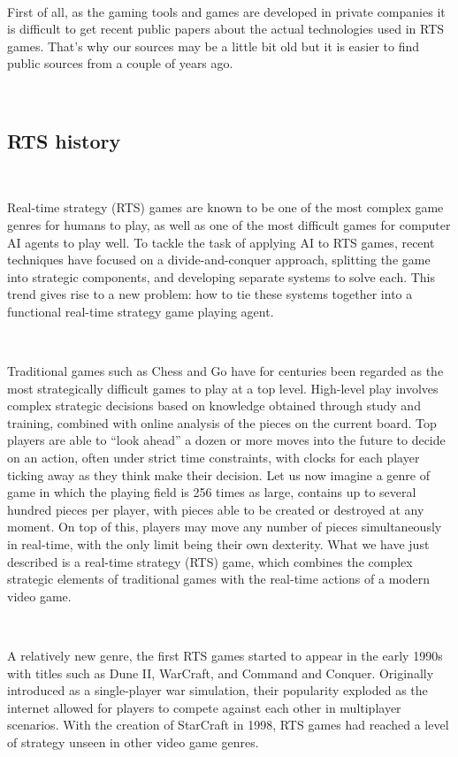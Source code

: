 \documentclass[a4paper,10pt]{book}
\begin{document}
~

First of all, as the gaming tools and games are developed in private companies it is difficult to get recent public papers about the actual technologies used in RTS games. 
That's why our sources may be a little bit old but it is easier to find public sources from a couple of years ago.

~

\subsection{RTS history}

~

Real-time strategy (RTS) games are known to be one of the
most  complex  game  genres  for  humans  to  play,  as  well  as
one  of  the  most  difficult  games  for  computer  AI  agents  to
play well.  To tackle the task of applying AI to RTS games,
recent techniques have focused on a divide-and-conquer approach, 
splitting the game into strategic components, and developing 
separate systems to solve each. This trend gives rise
to  a  new  problem:   how  to  tie  these  systems  together  into
a functional real-time strategy game playing agent.

~

Traditional games such as Chess and Go have for centuries
been  regarded  as  the  most  strategically  difficult  games  to
play at a top level. High-level play involves complex strategic
decisions  based  on  knowledge  obtained  through  study
and  training,  combined  with  online  analysis  of  the  pieces
on the current board.  Top players are able to “look ahead”
a dozen or more moves into the future to decide on an
action, often under strict time constraints, with clocks for each
player ticking away as they think make their decision.  Let
us now imagine a genre of game in which the playing field
is 256 times as large, contains up to several hundred pieces
per player, with pieces able to be created or destroyed at any
moment.  On top of this, players may move any number of
pieces simultaneously in real-time, with the only limit being
their own dexterity.   What we have just described is a
real-time strategy (RTS) game, which combines the complex
strategic elements of traditional games with the real-time 
actions of a modern video game.

~

A relatively new genre, the first RTS games started to appear
in  the  early  1990s  with  titles  such  as  Dune  II,  
WarCraft,  and Command and Conquer.   Originally introduced
as a single-player war simulation, their popularity exploded
as the internet allowed for players to compete against each
other in multiplayer scenarios. With the creation of StarCraft
in 1998, RTS games had reached a level of strategy unseen
in other video game genres.
\end{document}
